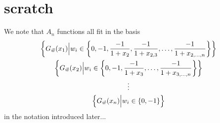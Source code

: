\documentclass[11pt]{article}
\begin{document}
\iffalse

\section{scratch}

We note that $A_n$ functions all fit in the basis
\begin{gather}
\left\{G_{\vec{\hspace{.0cm} w}}(x_1) \Big| w_i \in \left\{0, - 1, \frac{-1}{1 + x_2}, \frac{-1}{1 + x_{2,3}}, \dots , \frac{-1}{1 + x_{2,\dots,n}} \right\} \right\} \nonumber \\
\left\{G_{\vec{\hspace{.0cm} w}}(x_2) \Big| w_i \in \left\{0, - 1, \frac{-1}{1 + x_3}, \dots , \frac{-1}{1 + x_{3,\dots,n}} \right\} \right\} \\
\vdots \nonumber \\ 
\left\{G_{\vec{\hspace{.0cm} w}}(x_n) \Big| w_i \in \left\{0, - 1 \right\} \right\} \nonumber
\end{gather}
in the notation introduced later...
\end{document}
